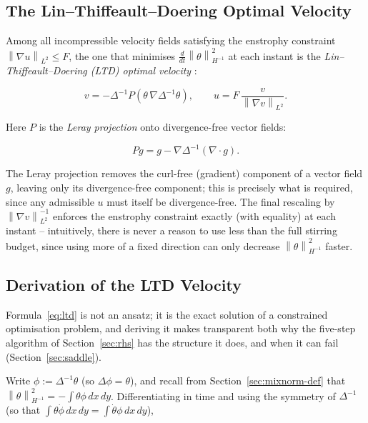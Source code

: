 \documentclass[12pt,a4paper]{article}
\newcommand{\norm}[1]{\left\lVert#1\right\rVert}
\newcommand{\Lap}{\Delta}
\newcommand{\lapinv}{\Delta^{-1}}
\newcommand{\Proj}{P}
\newcommand{\dx}{\,dx\,dy}
\theoremstyle{definition}
\theoremstyle{plain}
\begin{document}
\subsection{The Lin--Thiffeault--Doering Optimal Velocity}
\label{sec:ltd}

Among all incompressible velocity fields satisfying the enstrophy constraint
$\norm{\nabla u}_{L^2} \le F$, the one that minimises
$\frac{d}{dt}\norm{\theta}_{H^{-1}}^2$ at each instant is the
\emph{Lin--Thiffeault--Doering (LTD) optimal velocity}
\cite{LTD2011}:

\begin{equation}
  \label{eq:ltd}
  v = -\lapinv \Proj\!\left(\theta\,\nabla\lapinv\theta\right),
  \qquad
  u = F\,\frac{v}{\norm{\nabla v}_{L^2}}.
\end{equation}

Here $\Proj$ is the \emph{Leray projection} onto divergence-free vector
fields:

\begin{equation}
  \label{eq:leray}
  \Proj g = g - \nabla\lapinv(\nabla\cdot g).
\end{equation}

The Leray projection removes the curl-free (gradient) component of a vector
field $g$, leaving only its divergence-free component; this is precisely
what is required, since any admissible $u$ must itself be divergence-free.
The final rescaling by $\norm{\nabla v}_{L^2}^{-1}$ enforces the enstrophy
constraint exactly (with equality) at each instant -- intuitively, there is
never a reason to use less than the full stirring budget, since using more
of a fixed direction can only decrease $\norm{\theta}_{H^{-1}}^2$ faster.

\subsection{Derivation of the LTD Velocity}
\label{sec:derivation}

Formula~\eqref{eq:ltd} is not an ansatz; it is the exact solution of a
constrained optimisation problem, and deriving it makes transparent both
why the five-step algorithm of Section~\ref{sec:rhs} has the structure it
does, and when it can fail (Section~\ref{sec:saddle}).

Write $\phi := \lapinv\theta$ (so $\Lap\phi=\theta$), and recall from
Section~\ref{sec:mixnorm-def} that $\norm{\theta}_{H^{-1}}^2 =
-\int\theta\phi\dx$. Differentiating in time and using the symmetry of
$\Lap^{-1}$ (so that $\int\theta\dot\phi\dx = \int\dot\theta\phi\dx$),
\end{document}
